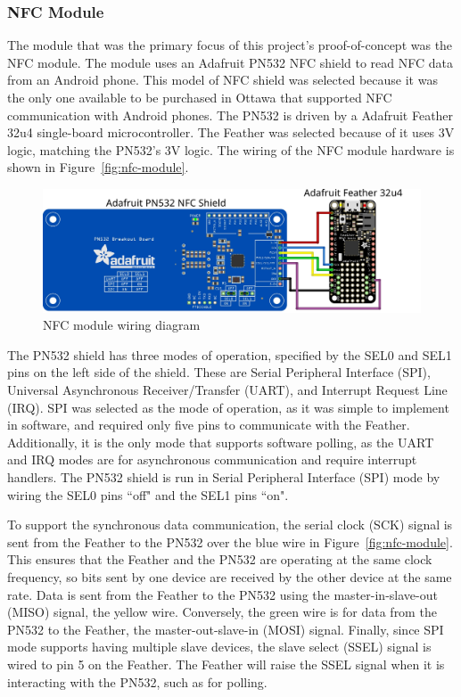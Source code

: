 \documentclass[12pt]{report}
\let\Oldsubsubsection\subsubsection
\renewcommand{\subsubsection}{\FloatBarrier\Oldsubsubsection}
\begin{document}
\subsubsection{NFC Module} \label{nfc-modules}

The module that was the primary focus of this project's proof-of-concept was the NFC module. The module uses an Adafruit 
PN532 NFC shield to read NFC data from an Android phone. This model of NFC shield was selected because it was the only 
one available to be purchased in Ottawa that supported NFC communication with Android phones. The PN532 is driven by a 
Adafruit Feather 32u4 single-board microcontroller. The Feather was selected because of it uses 3V logic, matching the 
PN532's 3V logic. The wiring of the NFC module hardware is shown in Figure~\ref{fig:nfc-module}.

\begin{figure}
    \includegraphics[width=\textwidth]{Diagrams/Hardware-Diagrams/nfc_module}
    \caption{NFC module wiring diagram}
    \label{fig:nfc-module-wiring}
\end{figure}

The PN532 shield has three modes of operation, specified by the SEL0 and SEL1 pins on the left side of the shield. 
These are Serial Peripheral Interface (SPI), Universal Asynchronous Receiver/Transfer (UART), and Interrupt Request 
Line (IRQ). SPI was selected as the mode of operation, as it was simple to implement in software, and required only five 
pins to communicate with the Feather. Additionally, it is the only mode that supports software polling, as the UART 
and IRQ modes are for asynchronous communication and require interrupt handlers. The PN532 shield is run in Serial 
Peripheral Interface (SPI) mode by wiring the SEL0 pins ``off" and the SEL1 pins ``on".

To support the synchronous data communication, the serial clock (SCK) signal is sent from the Feather to the PN532 over 
the blue wire in Figure~\ref{fig:nfc-module}. This ensures that the Feather and the PN532 are operating at the same 
clock frequency, so bits sent by one device are received by the other device at the same rate. Data is sent from the 
Feather to the PN532 using the master-in-slave-out (MISO) signal, the yellow wire. Conversely, the green wire is for 
data from the PN532 to the Feather, the master-out-slave-in (MOSI) signal. Finally, since SPI mode supports having 
multiple slave devices, the slave select (SSEL) signal is wired to pin 5 on the Feather. The Feather will raise the 
SSEL signal when it is interacting with the PN532, such as for polling.
\end{document}
